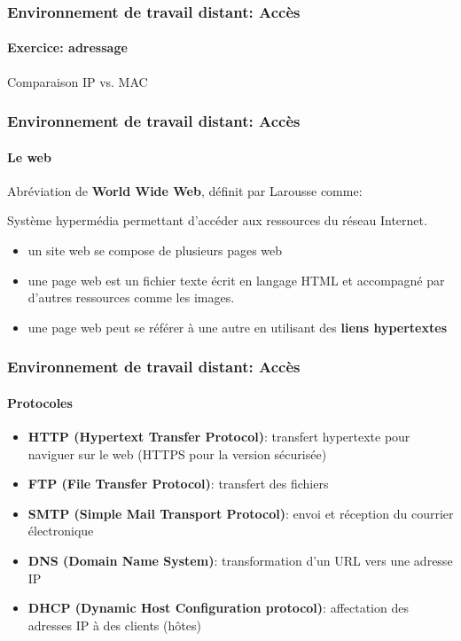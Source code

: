 \documentclass{beamer}
\begin{document}
\begin{frame}
\frametitle{Environnement de travail distant: Accès}
\framesubtitle{Exercice: adressage}

Comparaison IP vs. MAC



\end{frame}


\begin{frame}
\frametitle{Environnement de travail distant: Accès}
\framesubtitle{Le web}

Abréviation de \textbf{World Wide Web}, définit par Larousse comme:
\begin{definition}
	Système hypermédia permettant d'accéder aux ressources du réseau Internet.
\end{definition}

\begin{itemize}
	\item un site web se compose de plusieurs pages web
	\item une page web est un fichier texte écrit en langage HTML et accompagné par d'autres ressources comme les images. 
	\item une page web peut se référer à une autre en utilisant des \textbf{liens hypertextes} 
\end{itemize}

\end{frame}


\begin{frame}
\frametitle{Environnement de travail distant: Accès}
\framesubtitle{Protocoles}

\begin{itemize}
	\item \textbf{HTTP (Hypertext Transfer Protocol)}: transfert hypertexte pour naviguer sur le web  (HTTPS pour la
	version sécurisée)
	\item \textbf{FTP (File Transfer Protocol)}: transfert des fichiers
	\item \textbf{SMTP (Simple Mail Transport Protocol)}: envoi et réception du courrier électronique
	\item \textbf{DNS (Domain Name System)}: transformation d'un URL vers une adresse IP
	\item \textbf{DHCP (Dynamic Host Configuration protocol)}: affectation des adresses IP à des clients (hôtes)
\end{itemize}

\end{frame}
\end{document}
